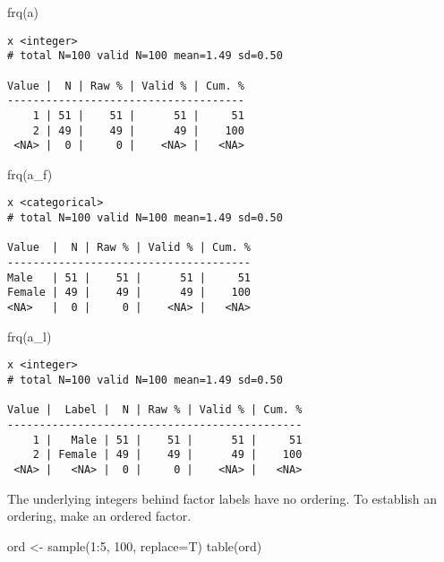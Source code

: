 \documentclass[
  letterpaper,
  DIV=11,
  numbers=noendperiod]{scrreprt}
\newenvironment{Shaded}{\begin{snugshade}}{\end{snugshade}}
\newcommand{\AttributeTok}[1]{\textcolor[rgb]{0.40,0.45,0.13}{#1}}
\newcommand{\DecValTok}[1]{\textcolor[rgb]{0.68,0.00,0.00}{#1}}
\newcommand{\FunctionTok}[1]{\textcolor[rgb]{0.28,0.35,0.67}{#1}}
\newcommand{\NormalTok}[1]{\textcolor[rgb]{0.00,0.23,0.31}{#1}}
\newcommand{\OtherTok}[1]{\textcolor[rgb]{0.00,0.23,0.31}{#1}}
\newcommand{\SpecialCharTok}[1]{\textcolor[rgb]{0.37,0.37,0.37}{#1}}
\begin{document}
\begin{Shaded}
\begin{Highlighting}[]
\FunctionTok{frq}\NormalTok{(a)}
\end{Highlighting}
\end{Shaded}

\begin{verbatim}
x <integer> 
# total N=100 valid N=100 mean=1.49 sd=0.50

Value |  N | Raw % | Valid % | Cum. %
-------------------------------------
    1 | 51 |    51 |      51 |     51
    2 | 49 |    49 |      49 |    100
 <NA> |  0 |     0 |    <NA> |   <NA>
\end{verbatim}

\begin{Shaded}
\begin{Highlighting}[]
\FunctionTok{frq}\NormalTok{(a\_f)}
\end{Highlighting}
\end{Shaded}

\begin{verbatim}
x <categorical> 
# total N=100 valid N=100 mean=1.49 sd=0.50

Value  |  N | Raw % | Valid % | Cum. %
--------------------------------------
Male   | 51 |    51 |      51 |     51
Female | 49 |    49 |      49 |    100
<NA>   |  0 |     0 |    <NA> |   <NA>
\end{verbatim}

\begin{Shaded}
\begin{Highlighting}[]
\FunctionTok{frq}\NormalTok{(a\_l)}
\end{Highlighting}
\end{Shaded}

\begin{verbatim}
x <integer> 
# total N=100 valid N=100 mean=1.49 sd=0.50

Value |  Label |  N | Raw % | Valid % | Cum. %
----------------------------------------------
    1 |   Male | 51 |    51 |      51 |     51
    2 | Female | 49 |    49 |      49 |    100
 <NA> |   <NA> |  0 |     0 |    <NA> |   <NA>
\end{verbatim}

The underlying integers behind factor labels have no ordering. To
establish an ordering, make an ordered factor.

\begin{Shaded}
\begin{Highlighting}[]
\NormalTok{ord }\OtherTok{\textless{}{-}} \FunctionTok{sample}\NormalTok{(}\DecValTok{1}\SpecialCharTok{:}\DecValTok{5}\NormalTok{, }\DecValTok{100}\NormalTok{, }\AttributeTok{replace=}\NormalTok{T)}
\FunctionTok{table}\NormalTok{(ord)}
\end{Highlighting}
\end{Shaded}
\end{document}
